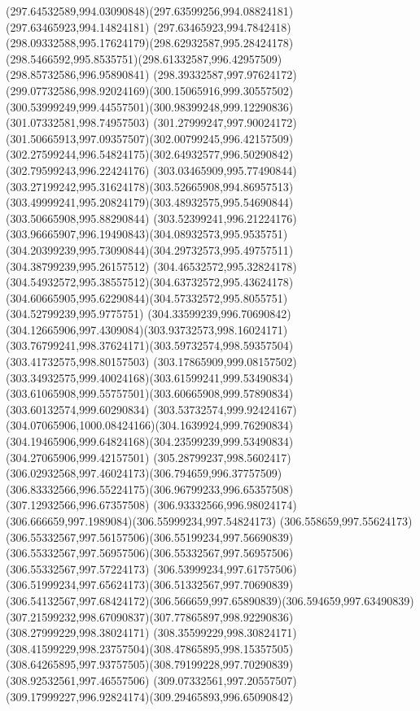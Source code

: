 {{\curveto(297.64532589,994.03090848)(297.63599256,994.08824181)(297.63465923,994.14824181)
\curveto(297.63465923,994.7842418)(298.09332588,995.17624179)(298.62932587,995.28424178)
\curveto(298.5466592,995.8535751)(298.61332587,996.42957509)(298.85732586,996.95890841)
\curveto(298.39332587,997.97624172)(299.07732586,998.92024169)(300.15065916,999.30557502)
\curveto(300.53999249,999.44557501)(300.98399248,999.12290836)(301.07332581,998.74957503)
\curveto(301.27999247,997.90024172)(301.50665913,997.09357507)(302.00799245,996.42157509)
\curveto(302.27599244,996.54824175)(302.64932577,996.50290842)(302.79599243,996.22424176)
\curveto(303.03465909,995.77490844)(303.27199242,995.31624178)(303.52665908,994.86957513)
\curveto(303.49999241,995.20824179)(303.48932575,995.54690844)(303.50665908,995.88290844)
\curveto(303.52399241,996.21224176)(303.96665907,996.19490843)(304.08932573,995.9535751)
\curveto(304.20399239,995.73090844)(304.29732573,995.49757511)(304.38799239,995.26157512)
\curveto(304.46532572,995.32824178)(304.54932572,995.38557512)(304.63732572,995.43624178)
\curveto(304.60665905,995.62290844)(304.57332572,995.8055751)(304.52799239,995.9775751)
\curveto(304.33599239,996.70690842)(304.12665906,997.4309084)(303.93732573,998.16024171)
\curveto(303.76799241,998.37624171)(303.59732574,998.59357504)(303.41732575,998.80157503)
\curveto(303.17865909,999.08157502)(303.34932575,999.40024168)(303.61599241,999.53490834)
\curveto(303.61065908,999.55757501)(303.60665908,999.57890834)(303.60132574,999.60290834)
\curveto(303.53732574,999.92424167)(304.07065906,1000.08424166)(304.1639924,999.76290834)
\curveto(304.19465906,999.64824168)(304.23599239,999.53490834)(304.27065906,999.42157501)
\curveto(305.28799237,998.5602417)(306.02932568,997.46024173)(306.794659,996.37757509)
\curveto(306.83332566,996.55224175)(306.96799233,996.65357508)(307.12932566,996.67357508)
\curveto(306.93332566,996.98024174)(306.666659,997.1989084)(306.55999234,997.54824173)
\curveto(306.558659,997.55624173)(306.55332567,997.56157506)(306.55199234,997.56690839)
\curveto(306.55332567,997.56957506)(306.55332567,997.56957506)(306.55332567,997.57224173)
\curveto(306.53999234,997.61757506)(306.51999234,997.65624173)(306.51332567,997.70690839)
\curveto(306.54132567,997.68424172)(306.566659,997.65890839)(306.594659,997.63490839)
\curveto(307.21599232,998.67090837)(307.77865897,998.92290836)(308.27999229,998.38024171)
\curveto(308.35599229,998.30824171)(308.41599229,998.23757504)(308.47865895,998.15357505)
\curveto(308.64265895,997.93757505)(308.79199228,997.70290839)(308.92532561,997.46557506)
\curveto(309.07332561,997.20557507)(309.17999227,996.92824174)(309.29465893,996.65090842)
}}
